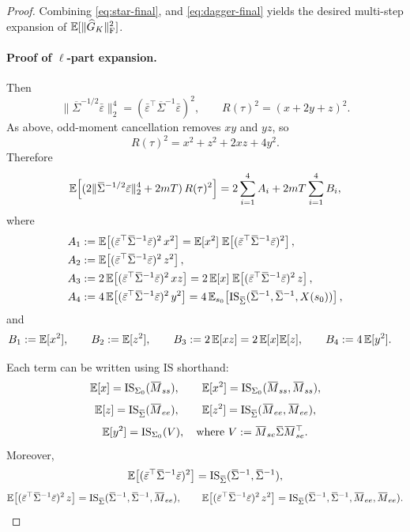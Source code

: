 \begin{proof}
Combining \eqref{eq:star-final}, and \eqref{eq:dagger-final} yields the desired
multi-step expansion of ${\mathbb{E}}[\|\widehat G_K\|_{\mathrm{F}}^2]$.

\paragraph{Proof of $\ell$-part expansion.}
Then
\[
\|\overline\Sigma^{-1/2}\bar\varepsilon\|_2^4
=
(\bar\varepsilon^\top \overline\Sigma^{-1} \bar\varepsilon)^2,
\qquad
R(\tau)^2=(x+2y+z)^2.
\]
As above, odd-moment cancellation removes $xy$ and $yz$, so
\[
R(\tau)^2=x^2+z^2+2xz+4y^2.
\]
Therefore
\[
\E\!\left[(2\|\overline\Sigma^{-1/2}\bar\varepsilon\|_2^4+2mT)\,R(\tau)^2\right]
=
2\sum_{i=1}^4 A_i + 2mT\sum_{i=1}^4 B_i,
\]
where
\begin{align*}
A_1 &:= \E\!\left[(\bar\varepsilon^\top \overline\Sigma^{-1}\bar\varepsilon)^2\,x^2\right]
     = \E[x^2]\;\E\!\left[(\bar\varepsilon^\top \overline\Sigma^{-1}\bar\varepsilon)^2\right],\\
A_2 &:= \E\!\left[(\bar\varepsilon^\top \overline\Sigma^{-1}\bar\varepsilon)^2\,z^2\right],\\
A_3 &:= 2\,\E\!\left[(\bar\varepsilon^\top \overline\Sigma^{-1}\bar\varepsilon)^2\,x z\right]
     = 2\,\E[x]\;\E\!\left[(\bar\varepsilon^\top \overline\Sigma^{-1}\bar\varepsilon)^2\,z\right],\\
A_4 &:= 4\,\E\!\left[(\bar\varepsilon^\top \overline\Sigma^{-1}\bar\varepsilon)^2\,y^2\right]
     = 4\,\E_{s_0}\!\left[\mathrm{IS}_{\overline\Sigma}(\overline\Sigma^{-1},\overline\Sigma^{-1},X(s_0))\right],
\end{align*}
and
\begin{align*}
B_1 &:= {\mathbb{E}}[x^2],\qquad
B_2 := {\mathbb{E}}[z^2],\qquad
B_3 := 2\,{\mathbb{E}}[xz]=2\,{\mathbb{E}}[x]{\mathbb{E}}[z],\qquad
B_4 := 4\,{\mathbb{E}}[y^2].
\end{align*}

Each term can be written using $\mathrm{IS}$ shorthand:
\[
\E[x]=\mathrm{IS}_{\Sigma_0}(\overline M_{ss}),
\qquad
\E[x^2]=\mathrm{IS}_{\Sigma_0}(\overline M_{ss},\overline M_{ss}),
\]
\[
\E[z]=\mathrm{IS}_{\overline\Sigma}(\overline M_{ee}),
\qquad
\E[z^2]=\mathrm{IS}_{\overline\Sigma}(\overline M_{ee},\overline M_{ee}),
\]
\[
\E[y^2]=\mathrm{IS}_{\Sigma_0}(V),
\quad\text{where }V:=\overline M_{se}\overline\Sigma \overline M_{se}^\top.
\]
Moreover,
\[
\E\!\left[(\bar\varepsilon^\top \overline\Sigma^{-1}\bar\varepsilon)^2\right]=\mathrm{IS}_{\overline\Sigma}(\overline\Sigma^{-1},\overline\Sigma^{-1}),
\]
\[
\E\!\left[(\bar\varepsilon^\top \overline\Sigma^{-1}\bar\varepsilon)^2\,z\right]
=\mathrm{IS}_{\overline\Sigma}(\overline\Sigma^{-1},\overline\Sigma^{-1},\overline M_{ee}),
\qquad
\E\!\left[(\bar\varepsilon^\top \overline\Sigma^{-1}\bar\varepsilon)^2\,z^2\right]
=\mathrm{IS}_{\overline\Sigma}(\overline\Sigma^{-1},\overline\Sigma^{-1},\overline M_{ee},\overline M_{ee}).
\]


\end{proof}
